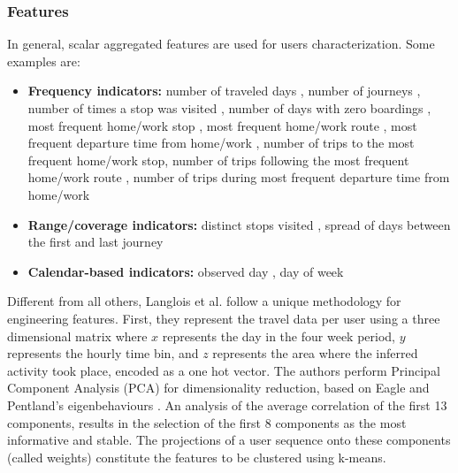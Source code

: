 \documentclass{article}
\begin{document}
\subsubsection{Features}
In general, scalar aggregated features are used for users characterization. Some examples are:

\begin{itemize}
\item \textbf{Frequency indicators:} number of traveled days \cite{bhaskar2015passenger} \cite{langlois2016inferring} \cite{ma2017understanding}, number of journeys \cite{bhaskar2015passenger}, number of times a stop was visited \cite{morency2007measuring}, number of days with zero boardings \cite{morency2007measuring}, most frequent home/work stop \cite{ma2017understanding}, most frequent home/work route \cite{ma2017understanding}, most frequent departure time from home/work \cite{ma2017understanding}, number of trips to the most frequent home/work stop\cite{ma2017understanding}, number of trips following the most frequent home/work route \cite{ma2017understanding}, number of trips during most frequent departure time from home/work \cite{ma2017understanding}

\item \textbf{Range/coverage indicators:} distinct stops visited \cite{morency2007measuring}, spread of days between the first and last journey \cite{langlois2016inferring}

\item \textbf{Calendar-based indicators:} observed day \cite{morency2007measuring}, day of week \cite{morency2007measuring}

\end{itemize}


Different from all others, Langlois et al. follow a unique methodology for engineering features. First, they represent the travel data per user using a three dimensional matrix where $x$ represents the day in the four week period, $y$ represents the hourly time bin, and $z$ represents the area where the inferred activity took place, encoded as a one hot vector. The authors perform Principal Component Analysis (PCA) for dimensionality reduction, based on Eagle and Pentland's eigenbehaviours \cite{eagle2009eigenbehaviors}. An analysis of the average correlation of the first 13 components, results in the selection of the first 8 components as the most informative and stable. The projections of a user sequence onto these components (called weights) constitute the features to be clustered using k-means. \cite{langlois2016inferring}
\end{document}
